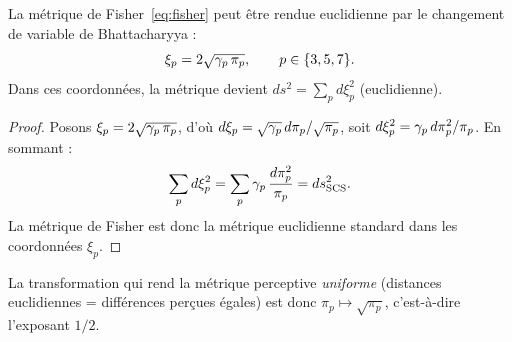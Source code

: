 \documentclass[12pt,a4paper]{article}
\begin{document}
\begin{derivedbox}
La m\'etrique de Fisher~\eqref{eq:fisher} peut \^etre rendue
euclidienne par le changement de variable de Bhattacharyya :
\begin{equation}
  \xi_p = 2\sqrt{\gamma_{p}\,\pi_p}, \qquad p \in \{3, 5, 7\}.
  \label{eq:bhattacharyya}
\end{equation}
Dans ces coordonn\'ees, la m\'etrique devient
$ds^2 = \sum_p d\xi_p^2$ (euclidienne).

\begin{proof}
Posons $\xi_p = 2\sqrt{\gamma_{p}\,\pi_p}$, d'o\`u
$d\xi_p = \sqrt{\gamma_{p}}\,d\pi_p / \sqrt{\pi_p}$, soit
$d\xi_p^2 = \gamma_{p}\,d\pi_p^2 / \pi_p$. En sommant :
\[
  \sum_p d\xi_p^2
  = \sum_p \gamma_{p}\,\frac{d\pi_p^2}{\pi_p}
  = ds^2_{\mathrm{SCS}}.
\]
La m\'etrique de Fisher est donc la m\'etrique euclidienne standard
dans les coordonn\'ees $\xi_p$.
\end{proof}
\end{derivedbox}

La transformation qui rend la m\'etrique perceptive \emph{uniforme}
(distances euclidiennes = diff\'erences per\c{c}ues \'egales) est donc
$\pi_p \mapsto \sqrt{\pi_p}$, c'est-\`a-dire l'exposant $1/2$.
\end{document}

